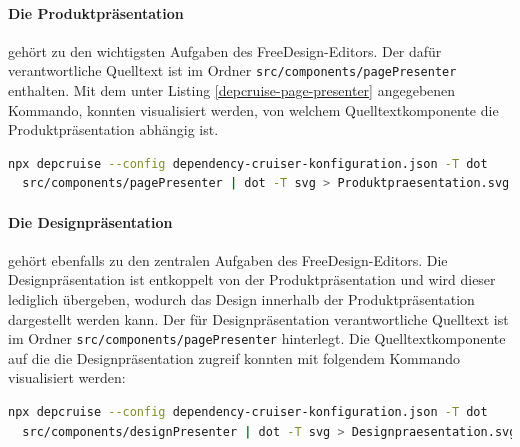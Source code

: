\paragraph{Die Produktpräsentation} gehört zu den wichtigsten Aufgaben des FreeDesign-Editors. 
Der dafür verantwortliche Quelltext ist im Ordner 
\lstinline|src/components/pagePresenter| enthalten. Mit dem unter Listing \ref{depcruise-page-presenter} angegebenen Kommando, konnten visualisiert werden, von welchem Quelltextkomponente die Produktpräsentation abhängig ist. 
\begin{lstlisting}[language={sh}, label=depcruise-page-presenter, caption=Erzeugung der Visualisierung der Abhängigkeiten für die Produktpräsentation]
npx depcruise --config dependency-cruiser-konfiguration.json -T dot
  src/components/pagePresenter | dot -T svg > Produktpraesentation.svg
\end{lstlisting}

\paragraph{Die Designpräsentation} gehört ebenfalls zu den zentralen Aufgaben des FreeDesign-Editors. Die Designpräsentation ist entkoppelt von der Produktpräsentation und wird dieser lediglich übergeben, wodurch das Design innerhalb der Produktpräsentation dargestellt werden kann.
Der für Designpräsentation verantwortliche Quelltext ist im Ordner \lstinline|src/components/pagePresenter| hinterlegt. Die Quelltextkomponente auf die die Designpräsentation zugreif konnten mit folgendem Kommando visualisiert werden:  
\begin{lstlisting}[language={sh}, label=depcruise-design-presenter, caption=Erzeugung der Visualisierung der Abhängigkeiten für die Designpräsentation]
npx depcruise --config dependency-cruiser-konfiguration.json -T dot 
  src/components/designPresenter | dot -T svg > Designpraesentation.svg
\end{lstlisting}

